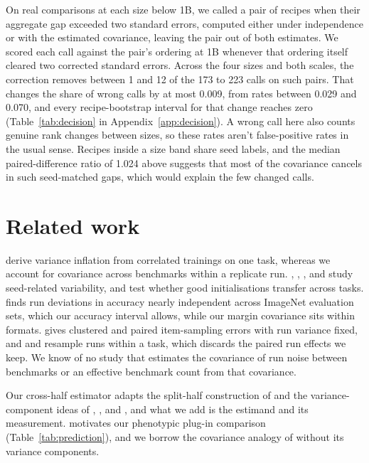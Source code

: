On real comparisons at each size below 1B, we called a pair of recipes when their aggregate gap exceeded two standard errors, computed either under independence or with the estimated covariance, leaving the pair out of both estimates. We scored each call against the pair's ordering at 1B whenever that ordering itself cleared two corrected standard errors. Across the four sizes and both scales, the correction removes between 1 and 12 of the 173 to 223 calls on such pairs. That changes the share of wrong calls by at most 0.009, from rates between 0.029 and 0.070, and every recipe-bootstrap interval for that change reaches zero (Table~\ref{tab:decision} in Appendix~\ref{app:decision}). A wrong call here also counts genuine rank changes between sizes, so these rates aren't false-positive rates in the usual sense. Recipes inside a size band share seed labels, and the median paired-difference ratio of 1.024 above suggests that most of the covariance cancels in such seed-matched gaps, which would explain the few changed calls.


\section{Related work}
\citet{bouthillier2021} derive variance inflation from correlated trainings on one task, whereas we account for covariance across benchmarks within a replicate run. \citet{reimers2017}, \citet{zhou2020}, \citet{madaan2024}, and \citet{fehlauer2025} study seed-related variability, and \citet{dodge2020} test whether good initialisations transfer across tasks. \citet{jordan2024} finds run deviations in accuracy nearly independent across ImageNet evaluation sets, which our accuracy interval allows, while our margin covariance sits within formats. \citet{miller2024} gives clustered and paired item-sampling errors with run variance fixed, and \citet{henderson2018} and \citet{agarwal2021} resample runs within a task, which discards the paired run effects we keep. We know of no study that estimates the covariance of run noise between benchmarks or an effective benchmark count from that covariance.

Our cross-half estimator adapts the split-half construction of \citet{spearman1910,brown1910} and the variance-component ideas of \citet{spearman1904}, \citet{cronbach1951}, and \citet{searle1992}, and what we add is the estimand and its measurement. \citet{cheverud1988} motivates our phenotypic plug-in comparison (Table~\ref{tab:prediction}), and we borrow the covariance analogy of \citet{martin1977} without its variance components.

